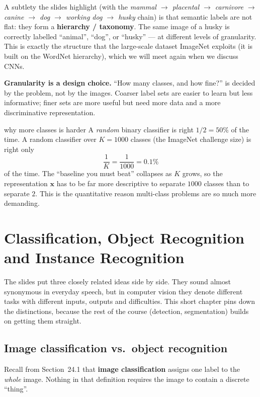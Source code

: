 \documentclass{report}
\newcommand{\xvec}{\mathbf{x}}
\begin{document}
A subtlety the slides highlight (with the
\emph{mammal $\to$ placental $\to$ carnivore $\to$ canine $\to$ dog $\to$
working dog $\to$ husky} chain) is that semantic labels are not flat: they form
a \textbf{hierarchy / taxonomy}. The same image of a husky is correctly
labelled ``animal'', ``dog'', or ``husky'' --- at different levels of
granularity. This is exactly the structure that the large-scale dataset
ImageNet exploits (it is built on the WordNet hierarchy), which we will meet
again when we discuss CNNs.

\begin{keybox}
\textbf{Granularity is a design choice.} ``How many classes, and how fine?''
is decided by the problem, not by the images. Coarser label sets are easier to
learn but less informative; finer sets are more useful but need more data and a
more discriminative representation.
\end{keybox}

\begin{exbox}{why more classes is harder}
A \emph{random} binary classifier is right $1/2 = 50\%$ of the time. A random
classifier over $K = 1000$ classes (the ImageNet challenge size) is right only
\[
\frac{1}{K} = \frac{1}{1000} = 0.1\%
\]
of the time. The ``baseline you must beat'' collapses as $K$ grows, so the
representation $\xvec$ has to be far more descriptive to separate $1000$
classes than to separate $2$. This is the quantitative reason multi-class
problems are so much more demanding.
\end{exbox}

\section{Classification, Object Recognition and Instance Recognition}

The slides put three closely related ideas side by side. They sound almost
synonymous in everyday speech, but in computer vision they denote different
tasks with different inputs, outputs and difficulties. This short chapter pins
down the distinctions, because the rest of the course (detection,
segmentation) builds on getting them straight.

\subsection{Image classification vs.\ object recognition}

Recall from Section~24.1 that \textbf{image classification} assigns one label to
the \emph{whole} image. Nothing in that definition requires the image to
contain a discrete ``thing''.
\end{document}
